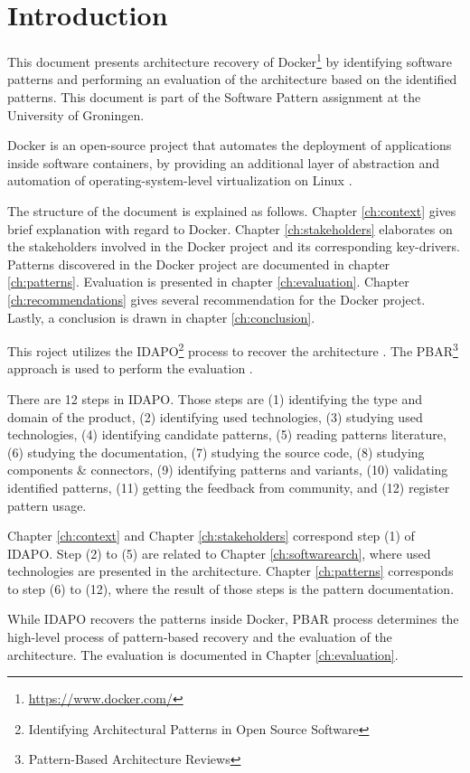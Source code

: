 \clearpage
\chapter{Introduction}
\label{ch:introduction}
This document presents architecture recovery of
Docker\footnote{\url{https://www.docker.com/}} by identifying software patterns
and performing an evaluation of the architecture based on the identified
patterns. This document is part of the Software Pattern assignment at the
University of Groningen.

Docker is an open-source project that automates the deployment of applications
inside software containers, by providing an additional layer of abstraction and
automation of operating-system-level virtualization on Linux \cite{dockerdef}.

The structure of the document is explained as follows. Chapter \ref{ch:context}
gives brief explanation with regard to Docker. Chapter \ref{ch:stakeholders}
elaborates on the stakeholders involved in the Docker project and its
corresponding key-drivers. Patterns discovered in the Docker project are
documented in chapter \ref{ch:patterns}. Evaluation is presented in chapter
\ref{ch:evaluation}. Chapter \ref{ch:recommendations} gives several
recommendation for the Docker project. Lastly, a conclusion is drawn in chapter
\ref{ch:conclusion}.

This roject utilizes the IDAPO\footnote{Identifying Architectural Patterns in
Open Source Software} process to recover the architecture \cite{idapo}. The
PBAR\footnote{Pattern-Based Architecture Reviews} approach is used to perform
the evaluation \cite{pbar}.

There are 12 steps in IDAPO. Those steps are (1) identifying the type and domain
of the product, (2) identifying used technologies, (3) studying used
technologies, (4) identifying candidate patterns, (5) reading patterns
literature, (6) studying the documentation, (7) studying the source code, (8)
studying components \& connectors, (9) identifying patterns and variants, (10)
validating identified patterns, (11) getting the feedback from community, and
(12) register pattern usage.

Chapter \ref{ch:context} and Chapter \ref{ch:stakeholders} correspond step (1)
of IDAPO. Step (2) to (5) are related to Chapter \ref{ch:softwarearch}, where
used technologies are presented in the architecture. Chapter \ref{ch:patterns}
corresponds to step (6) to (12), where the result of those steps is the pattern
documentation.

While IDAPO recovers the patterns inside Docker, PBAR process determines the
high-level process of pattern-based recovery and the evaluation of the
architecture. The evaluation is documented in Chapter \ref{ch:evaluation}.